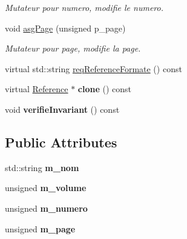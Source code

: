 \begin{DoxyCompactItemize}
\begin{DoxyCompactList}\small\item\em Mutateur pour numero, modifie le numero. \end{DoxyCompactList}\item 
\hypertarget{classtp_1_1Journal_a70c16c8d5211258396c801de34705ef6}{}void \hyperlink{classtp_1_1Journal_a70c16c8d5211258396c801de34705ef6}{asg\+Page} (unsigned p\+\_\+page)\label{classtp_1_1Journal_a70c16c8d5211258396c801de34705ef6}

\begin{DoxyCompactList}\small\item\em Mutateur pour page, modifie la page. \end{DoxyCompactList}\item 
virtual std\+::string \hyperlink{classtp_1_1Journal_adbc714005b9d394b6b76ba7f5f9f560f}{req\+Reference\+Formate} () const 
\item 
\hypertarget{classtp_1_1Journal_ade5cb6f330a331f626f27b877617a723}{}virtual \hyperlink{classtp_1_1Reference}{Reference} $\ast$ {\bfseries clone} () const \label{classtp_1_1Journal_ade5cb6f330a331f626f27b877617a723}

\item 
\hypertarget{classtp_1_1Journal_a532b58f942cbaf5fce074e5ca7a5ee54}{}void {\bfseries verifie\+Invariant} () const \label{classtp_1_1Journal_a532b58f942cbaf5fce074e5ca7a5ee54}

\end{DoxyCompactItemize}
\subsection*{Public Attributes}
\begin{DoxyCompactItemize}
\item 
\hypertarget{classtp_1_1Journal_a887da7c6effea08f87f9f2769fd55ac9}{}std\+::string {\bfseries m\+\_\+nom}\label{classtp_1_1Journal_a887da7c6effea08f87f9f2769fd55ac9}

\item 
\hypertarget{classtp_1_1Journal_a86783fee0013f17545b9563b9bfa69ec}{}unsigned {\bfseries m\+\_\+volume}\label{classtp_1_1Journal_a86783fee0013f17545b9563b9bfa69ec}

\item 
\hypertarget{classtp_1_1Journal_aaa4bbd5bed61481d0085472bca39ddc2}{}unsigned {\bfseries m\+\_\+numero}\label{classtp_1_1Journal_aaa4bbd5bed61481d0085472bca39ddc2}

\item 
\hypertarget{classtp_1_1Journal_a4d4d2155cec44c454848c47fe4001393}{}unsigned {\bfseries m\+\_\+page}\label{classtp_1_1Journal_a4d4d2155cec44c454848c47fe4001393}

\end{DoxyCompactItemize}


